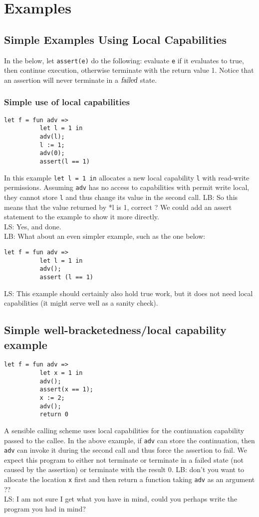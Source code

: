 \documentclass{article}
\newcommand\lau[1]{{\color{purple} \sf \footnotesize {LS: #1}}\\}
\newcommand\lars[1]{{\color{purple} \sf \footnotesize {LB: #1}}\\}
\newcommand{\failed}{\textsl{failed}}
\begin{document}
\section{Examples}
\label{sec:examples}
\subsection{Simple Examples Using Local Capabilities}
\label{subsec:example-loc-cap}
In the below, let \texttt{assert(e)} do the following: evaluate \texttt{e} if it evaluates to true, then continue execution, otherwise terminate with the return value 1. Notice that an assertion will never terminate in a $\failed$ state.
\subsubsection{Simple use of local capabilities}
\begin{verbatim}
let f = fun adv =>
          let l = 1 in
          adv(l);
          l := 1;
          adv(0);
          assert(l == 1)
\end{verbatim}
In this example \texttt{let l = 1 in} allocates a new local capability \texttt{l} with read-write permissions. Assuming \texttt{adv} has no access to capabilities with permit write local, they cannot store \texttt{l} and thus change its value in the second call.
\lars{So this means that the value returned by *l is 1, correct ? We
  could add an assert statement to the example to show it more directly.}
\lau{Yes, and done.}

\lars{What about an even simpler example, such as the one below:}
\begin{verbatim}
let f = fun adv =>
          let l = 1 in
          adv();
          assert (l == 1)
\end{verbatim}
\lau{This example should certainly also hold true work, but it does not need local capabilities (it might serve well as a sanity check). }

\subsection{Simple well-bracketedness/local capability example}
\begin{verbatim}
let f = fun adv =>
          let x = 1 in
          adv();
          assert(x == 1);
          x := 2;
          adv();
          return 0
\end{verbatim}
A sensible calling scheme uses local capabilities for the continuation capability passed to the callee. In the above example, if \texttt{adv} can store the continuation, then 
\texttt{adv} can invoke it during the second call and thus force the assertion to fail. We expect this program to either not terminate or terminate in a failed state (not caused by the assertion) or terminate with the result 0.
\lars{don't you want to allocate the location \texttt{x} first and then
  return a function taking \texttt{adv} as an argument ??}
\lau{I am not sure I get what you have in mind, could you perhaps write the program you had in mind?}
\end{document}
